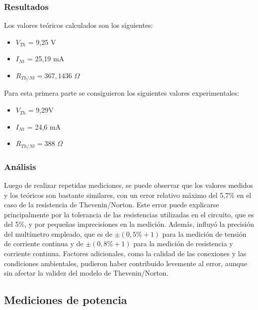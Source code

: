 \documentclass{article}
\begin{document}
            \subsubsection{Resultados}

                \quad Los valores teóricos calculados son los siguientes:
            	\begin{itemize}
                \item $V_{Th}$ = 9,25 V
                \item $I_{Nt}$ = 25,19 mA
                \item $R_{Th/Nt} = 367,1436$ $\Omega$
                \end{itemize}

                \quad Para esta primera parte se consiguieron los siguientes valores experimentales:
            	\begin{itemize}
                \item $V_{Th}$ = 9,29V
                \item $I_{Nt}$ = 24,6 mA
                \item $R_{Th/Nt} = 388$ $\Omega$
                \end{itemize}

            \subsubsection{Análisis}

            \quad Luego de realizar repetidas mediciones, se puede observar que los valores medidos y los teóricos son bastante similares, 
            con un error relativo máximo del 5,7\% en el caso de la resistencia de Thevenin/Norton. 
            Este error puede explicarse principalmente por la tolerancia de las resistencias utilizadas en el circuito, 
            que es del 5\%, y por pequeñas imprecisiones en la medición. Además, influyó la precisión del multímetro empleado, 
            que es de $\pm(0,5\% + 1)$ para la medición de tensión de corriente continua y de $\pm (0,8\% + 1)$ para la medición 
            de resistencia y corriente continua. 
            Factores adicionales, como la calidad de las conexiones y las condiciones ambientales, pudieron haber contribuido 
            levemente al error, aunque sin afectar la validez del modelo de Thevenin/Norton.
        \subsection{Mediciones de potencia}
\end{document}

